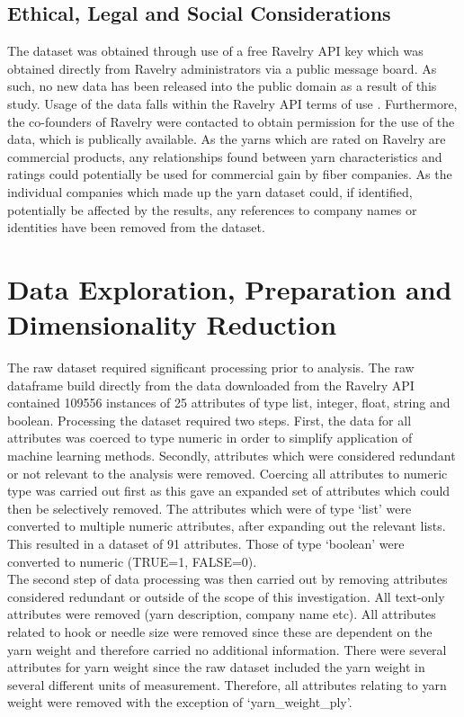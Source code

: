 \documentclass[journal]{IEEEtran}
\begin{document}
\subsection{Ethical, Legal and Social Considerations}

The dataset was obtained through use of a free Ravelry API key which was obtained directly from Ravelry administrators via a public message board. As such, no new data has been released into the public domain as a result of this study. Usage of the data falls within the Ravelry API terms of use \cite{forbes2014}. Furthermore, the co-founders of Ravelry were contacted to obtain permission for the use of the data, which is publically available.
As the yarns which are rated on Ravelry are commercial products, any relationships found between yarn characteristics and ratings could potentially be used for commercial gain by fiber companies. As the individual companies which made up the yarn dataset could, if identified, potentially be affected by the results, any references to company names or identities have been removed from the dataset.



\section{Data Exploration, Preparation and Dimensionality Reduction}
The raw dataset required significant processing prior to analysis. The raw dataframe build directly from the data downloaded from the Ravelry API contained 109556 instances of 25 attributes of type list, integer, float, string and boolean. Processing the dataset required two steps. First, the data for all attributes was coerced to type numeric in order to simplify application of machine learning methods. Secondly, attributes which were considered redundant or not relevant to the analysis were removed. Coercing all attributes to numeric type was carried out first as this gave an expanded set of attributes which could then be selectively removed. The attributes which were of type ‘list’ were converted to multiple numeric attributes, after expanding out the relevant lists. This resulted in a dataset of 91 attributes. Those of type ‘boolean’ were converted to numeric (TRUE=1, FALSE=0). \\

The second step of data processing was then carried out by removing attributes considered redundant or outside of the scope of this investigation. All text-only attributes were removed (yarn description, company name etc). All attributes related to hook or needle size were removed since these are dependent on the yarn weight and therefore carried no additional information. There were several attributes for yarn weight since the raw dataset included the yarn weight in several different units of measurement. Therefore, all attributes relating to yarn weight were removed with the exception of ‘yarn\_weight\_ply’.
\end{document}
